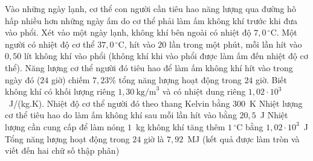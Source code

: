 	\begin{ex}%
		Vào những ngày lạnh, cơ thể con người cần tiêu hao năng lượng qua đường hô hấp nhiều hơn những ngày ấm do cơ thể phải làm ấm không khí trước khi đưa vào phổi. Xét vào một ngày lạnh, không khí bên ngoài có nhiệt độ $7{,}0\,^\circ\text{C}$. Một người có nhiệt độ cơ thể $37{,}0\,^\circ\text{C}$, hít vào $20$ lần trong một phút, mỗi lần hít vào $0{,}50$ lít không khí vào phổi (không khí khi vào phổi được làm ấm đến nhiệt độ cơ thể). Năng lượng cơ thể người đó tiêu hao để làm ấm không khí hít vào trong ngày đó ($24$ giờ) chiếm $7{,}23\%$ tổng năng lượng hoạt động trong $24$ giờ. Biết không khí có khối lượng riêng $1{,}30~\text{kg/m}^3$ và có nhiệt dung riêng $1{,}02\cdot 10^3$~J/(kg.K).
		\choiceTFt
		{Nhiệt độ cơ thể người đó theo thang Kelvin bằng $300$~K}
		{Nhiệt lượng cơ thể tiêu hao do làm ấm không khí sau mỗi lần hít vào bằng $20{,}5$~J}
		{\True Nhiệt lượng cần cung cấp để làm nóng $1$~kg không khí tăng thêm $1\,^\circ\text{C}$ bằng $1{,}02\cdot 10^3$~J}
		{\True Tổng năng lượng hoạt động trong $24$ giờ là $7{,}92$~MJ (kết quả được làm tròn và viết đến hai chữ số thập phân)}
	\end{ex}

